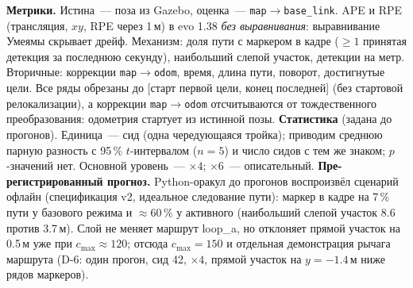 \documentclass[10pt,twocolumn]{article}
\begin{document}
\textbf{Метрики.} Истина~--- поза из Gazebo, оценка~--- \texttt{map}$\to$\texttt{base\_link}. APE и RPE (трансляция, $xy$, RPE через 1\,м) в evo 1.38 \emph{без выравнивания}: выравнивание Умеямы скрывает дрейф.
Механизм: доля пути с маркером в кадре ($\ge1$ принятая детекция за последнюю секунду), наибольший слепой участок, детекции на метр. Вторичные: коррекции \texttt{map}$\to$\texttt{odom}, время, длина пути, поворот, достигнутые цели.
Все ряды обрезаны до [старт первой цели, конец последней] (без стартовой релокализации), а коррекции \texttt{map}$\to$\texttt{odom} отсчитываются от тождественного преобразования: одометрия стартует из истинной позы.
\textbf{Статистика} (задана до прогонов). Единица~--- сид (одна чередующаяся тройка); приводим среднюю парную разность с 95\,\% $t$-интервалом ($n=5$) и число сидов с тем же знаком; $p$-значений нет. Основной уровень~--- ${\times}4$; ${\times}6$~--- описательный.
\textbf{Пре-регистрированный прогноз.} Python-оракул до прогонов воспроизвёл сценарий офлайн (спецификация v2, идеальное следование пути): маркер в кадре на 7\,\% пути у базового режима и $\approx$60\,\% у активного (наибольший слепой участок 8.6 против 3.7\,м). Слой не меняет маршрут loop\_a, но отклоняет прямой участок на 0.5\,м уже при $c_{\max}\approx120$; отсюда $c_{\max}=150$ и отдельная демонстрация рычага маршрута (D-6: один прогон, сид 42, ${\times}4$, прямой участок на $y=-1.4$\,м ниже рядов маркеров).
\end{document}
